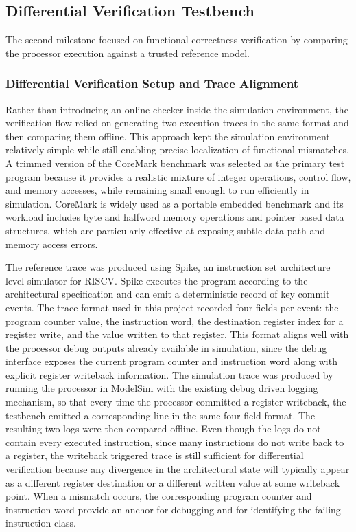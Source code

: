 \documentclass[12pt]{article}
\begin{document}
\subsection{Differential Verification Testbench}
The second milestone focused on functional correctness verification by comparing the processor execution against a trusted reference model. 
\subsubsection{Differential Verification Setup and Trace Alignment}
Rather than introducing an online checker inside the simulation environment, the verification flow relied on generating two execution traces in the same format and then comparing them offline. This approach kept the simulation environment relatively simple while still enabling precise localization of functional mismatches. A trimmed version of the CoreMark benchmark was selected as the primary test program because it provides a realistic mixture of integer operations, control flow, and memory accesses, while remaining small enough to run efficiently in simulation. CoreMark is widely used as a portable embedded benchmark and its workload includes byte and halfword memory operations and pointer based data structures, which are particularly effective at exposing subtle data path and memory access errors.

The reference trace was produced using Spike, an instruction set architecture level simulator for RISCV. Spike executes the program according to the architectural specification and can emit a deterministic record of key commit events. The trace format used in this project recorded four fields per event: the program counter value, the instruction word, the destination register index for a register write, and the value written to that register. This format aligns well with the processor debug outputs already available in simulation, since the debug interface exposes the current program counter and instruction word along with explicit register writeback information. The simulation trace was produced by running the processor in ModelSim with the existing debug driven logging mechanism, so that every time the processor committed a register writeback, the testbench emitted a corresponding line in the same four field format. The resulting two logs were then compared offline. Even though the logs do not contain every executed instruction, since many instructions do not write back to a register, the writeback triggered trace is still sufficient for differential verification because any divergence in the architectural state will typically appear as a different register destination or a different written value at some writeback point. When a mismatch occurs, the corresponding program counter and instruction word provide an anchor for debugging and for identifying the failing instruction class.
\end{document}
